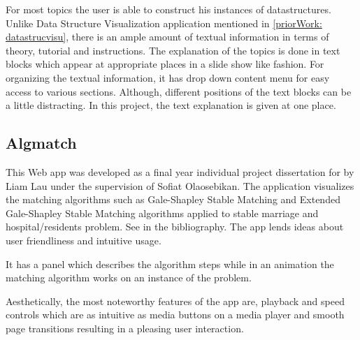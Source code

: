 For most topics the user is able to construct his instances of datastructures.
Unlike Data Structure Visualization application mentioned in
\autoref{priorWork: datastrucvisu}, there is an ample amount of textual
information in terms of theory, tutorial and instructions. The explanation of
the topics is done in text blocks which appear at appropriate places in a slide
show like fashion. For organizing the textual information, it has drop down
content menu for easy access to various sections. Although, different positions
of the text blocks can be a little distracting. In this project, the text explanation
is given at one place.


\subsection{Algmatch}
\label{priorWork: algmatch}
This Web app was developed as a final year individual project dissertation for
by Liam Lau under the supervision of Sofiat Olaosebikan. The application
visualizes the matching algorithms such as Gale-Shapley Stable Matching and
Extended Gale-Shapley Stable Matching algorithms applied to stable marriage and
hospital/residents problem. See \cite{LiamApp} in the bibliography. The app
lends ideas about user friendliness and intuitive usage.

It has a panel which describes the algorithm steps while in an animation the
matching algorithm works on an instance of the problem.

Aesthetically, the most noteworthy features of the app are, playback and speed
controls which are as intuitive as media buttons on a media player and smooth
page transitions resulting in a pleasing user interaction.
